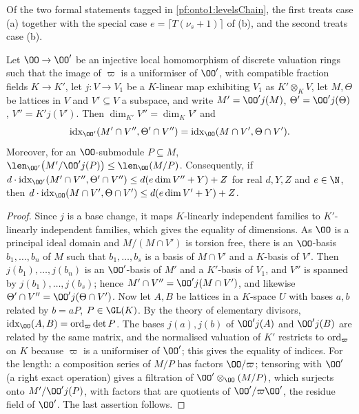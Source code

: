 \begin{remark}\label{pf:onto1:rem-levelschain}
Of the two formal statements tagged in \cref{pf:onto1:levelsChain}, the first treats case (a) together with the
special case $e=\lceil T(\nu_s+1)\rceil$ of (b), and the second treats case (b).
\end{remark}

\begin{lemma}\label{pf:onto1:descent}
Let $\OO\to\OO'$ be an injective local homomorphism of discrete valuation rings such that the image of $\varpi$ is
a uniformiser of $\OO'$, with compatible fraction fields $K\to K'$, let $j\colon V\to V_1$ be a $K$-linear map
exhibiting $V_1$ as $K'\otimes_KV$, let $M,\Theta$ be lattices in $V$ and $V'\subseteq V$ a subspace, and write
$M'=\OO'j(M)$, $\Theta'=\OO'j(\Theta)$, $V''=K'j(V')$. Then $\dim_{K'}V''=\dim_KV'$ and
\[
\ontooneidx_{\OO'}(M'\cap V'',\Theta'\cap V'')=\ontooneidx_{\OO}(M\cap V',\Theta\cap V').
\]
Moreover, for an $\OO$-submodule $P\subseteq M$, $\len_{\OO'}\bigl(M'/\OO'j(P)\bigr)\le\len_{\OO}(M/P)$.
Consequently, if $d\cdot\ontooneidx_{\OO'}(M'\cap V'',\Theta'\cap V'')\le d(e\dim V''+Y)+Z$ for real $d,Y,Z$ and
$e\in\N$, then $d\cdot\ontooneidx_{\OO}(M\cap V',\Theta\cap V')\le d(e\dim V'+Y)+Z$.
\end{lemma}

\begin{proof}
Since $j$ is a base change, it maps $K$-linearly independent families to $K'$-linearly independent families,
which gives the equality of dimensions. As $\OO$ is a principal ideal domain and $M/(M\cap V')$ is torsion
free, there is an $\OO$-basis $b_1,\dots,b_n$ of $M$ such that $b_1,\dots,b_s$ is a basis of $M\cap V'$ and a
$K$-basis of $V'$. Then $j(b_1),\dots,j(b_n)$ is an $\OO'$-basis of $M'$ and a $K'$-basis of $V_1$, and $V''$ is
spanned by $j(b_1),\dots,j(b_s)$; hence $M'\cap V''=\OO'j(M\cap V')$, and likewise $\Theta'\cap V''=\OO'j(\Theta\cap
V')$. Now let $A,B$ be lattices in a $K$-space $U$ with bases $a,b$ related by $b=aP$, $P\in\GL(K)$. By the theory
of elementary divisors, $\ontooneidx_{\OO}(A,B)=\ontooneord_\varpi\det P$. The bases $j(a),j(b)$ of $\OO'j(A)$ and
$\OO'j(B)$ are related by the same matrix, and the normalised valuation of $K'$ restricts to $\operatorname{ord}_\varpi$ on
$K$ because $\varpi$ is a uniformiser of $\OO'$; this gives the equality of indices. For the length: a
composition series of $M/P$ has factors $\OO/\varpi$; tensoring with $\OO'$ (a right exact operation) gives a
filtration of $\OO'\otimes_{\OO}(M/P)$, which surjects onto $M'/\OO'j(P)$, with factors that are quotients of
$\OO'/\varpi\OO'$, the residue field of $\OO'$. The last assertion follows.
\end{proof}


